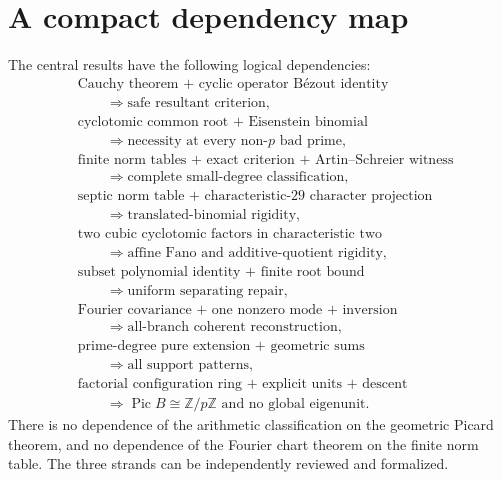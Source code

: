 \documentclass[11pt,a4paper]{article}
\theoremstyle{definition}
\theoremstyle{remark}
\newcommand{\Z}{\mathbb Z}
\newcommand{\Pic}{\operatorname{Pic}}
\begin{document}
\section{A compact dependency map}

The central results have the following logical dependencies:
\begin{align*}
 &\text{Cauchy theorem + cyclic operator B\'ezout identity}\\
 &\hspace{2em}\Longrightarrow\text{safe resultant criterion},\\[3pt]
 &\text{cyclotomic common root + Eisenstein binomial}\\
 &\hspace{2em}\Longrightarrow\text{necessity at every non-$p$ bad prime},\\[3pt]
 &\text{finite norm tables + exact criterion + Artin--Schreier witness}\\
 &\hspace{2em}\Longrightarrow\text{complete small-degree classification},\\[3pt]
 &\text{septic norm table + characteristic-$29$ character projection}\\
 &\hspace{2em}\Longrightarrow\text{translated-binomial rigidity},\\[3pt]
 &\text{two cubic cyclotomic factors in characteristic two}\\
 &\hspace{2em}\Longrightarrow\text{affine Fano and additive-quotient rigidity},\\[3pt]
 &\text{subset polynomial identity + finite root bound}\\
 &\hspace{2em}\Longrightarrow\text{uniform separating repair},\\[3pt]
 &\text{Fourier covariance + one nonzero mode + inversion}\\
 &\hspace{2em}\Longrightarrow\text{all-branch coherent reconstruction},\\[3pt]
 &\text{prime-degree pure extension + geometric sums}\\
 &\hspace{2em}\Longrightarrow\text{all support patterns},\\[3pt]
 &\text{factorial configuration ring + explicit units + descent}\\
 &\hspace{2em}\Longrightarrow\Pic B\cong\Z/p\Z\text{ and no global eigenunit}.
\end{align*}
There is no dependence of the arithmetic classification on the geometric
Picard theorem, and no dependence of the Fourier chart theorem on the
finite norm table. The three strands can be independently reviewed and
formalized.
\end{document}
